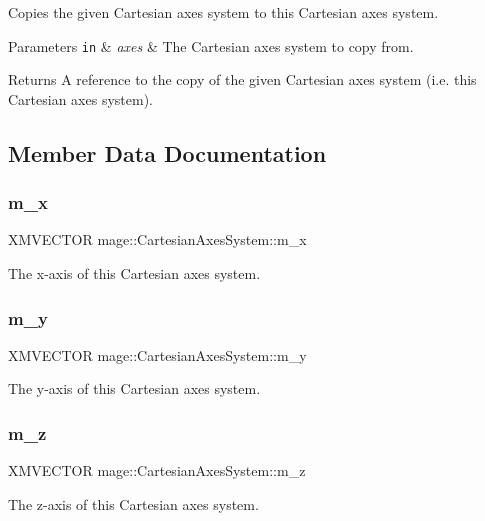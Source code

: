 Copies the given Cartesian axes system to this Cartesian axes system.


\begin{DoxyParams}[1]{Parameters}
\mbox{\tt in}  & {\em axes} & The Cartesian axes system to copy from. \\
\hline
\end{DoxyParams}
\begin{DoxyReturn}{Returns}
A reference to the copy of the given Cartesian axes system (i.\+e. this Cartesian axes system). 
\end{DoxyReturn}


\subsection{Member Data Documentation}
\hypertarget{structmage_1_1_cartesian_axes_system_aa840c10ca92782e8c87c1ab53f0b86e9}{}\label{structmage_1_1_cartesian_axes_system_aa840c10ca92782e8c87c1ab53f0b86e9} 
\subsubsection{\texorpdfstring{m\+\_\+x}{m\_x}}
{\footnotesize\ttfamily X\+M\+V\+E\+C\+T\+OR mage\+::\+Cartesian\+Axes\+System\+::m\+\_\+x\hspace{0.3cm}{\ttfamily [private]}}

The x-\/axis of this Cartesian axes system. \hypertarget{structmage_1_1_cartesian_axes_system_a2cc6bc4fe185791a877e1418e85d6b47}{}\label{structmage_1_1_cartesian_axes_system_a2cc6bc4fe185791a877e1418e85d6b47} 
\subsubsection{\texorpdfstring{m\+\_\+y}{m\_y}}
{\footnotesize\ttfamily X\+M\+V\+E\+C\+T\+OR mage\+::\+Cartesian\+Axes\+System\+::m\+\_\+y\hspace{0.3cm}{\ttfamily [private]}}

The y-\/axis of this Cartesian axes system. \hypertarget{structmage_1_1_cartesian_axes_system_abc733e5f82104391b0b352d263313d64}{}\label{structmage_1_1_cartesian_axes_system_abc733e5f82104391b0b352d263313d64} 
\subsubsection{\texorpdfstring{m\+\_\+z}{m\_z}}
{\footnotesize\ttfamily X\+M\+V\+E\+C\+T\+OR mage\+::\+Cartesian\+Axes\+System\+::m\+\_\+z\hspace{0.3cm}{\ttfamily [private]}}

The z-\/axis of this Cartesian axes system. 